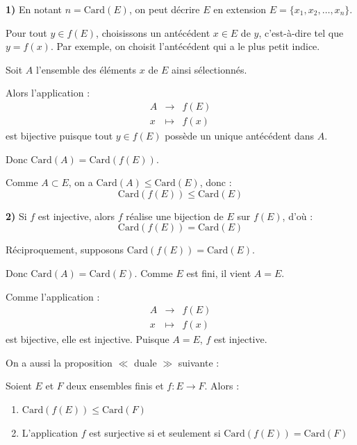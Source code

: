 \documentclass[a4paper,11pt]{article}
\begin{document}
\begin{demonstration}
    \textbf{1)} En notant $n = \text{Card}(E)$, on peut décrire $E$ en extension $E = \{x_1, x_2, \dots, x_n\}$.
    
    Pour tout $y \in f(E)$, choisissons un antécédent $x \in E$ de $y$, c'est-à-dire tel que $y = f(x)$. Par exemple, on choisit l'antécédent qui a le plus petit indice.
    
    Soit $A$ l'ensemble des éléments $x$ de $E$ ainsi sélectionnés.
    
    Alors l'application :
    \[
    \begin{array}{ccc}
        A & \longrightarrow & f(E) \\
        x & \longmapsto & f(x)
    \end{array}
    \]
    est bijective puisque tout $y \in f(E)$ possède un unique antécédent dans $A$.
    
    Donc $\text{Card}(A) = \text{Card}(f(E))$.
    
    Comme $A \subset E$, on a $\text{Card}(A) \le \text{Card}(E)$, donc :
    \[
    \text{Card}(f(E)) \le \text{Card}(E)
    \]
    
    \vspace{10pt}
    \textbf{2)} Si $f$ est injective, alors $f$ réalise une bijection de $E$ sur $f(E)$, d'où :
    \[
    \text{Card}(f(E)) = \text{Card}(E)
    \]
    
    Réciproquement, supposons $\text{Card}(f(E)) = \text{Card}(E)$.
    
    Donc $\text{Card}(A) = \text{Card}(E)$. Comme $E$ est fini, il vient $A = E$.
    
    Comme l'application :
    \[
    \begin{array}{ccc}
        A & \longrightarrow & f(E) \\
        x & \longmapsto & f(x)
    \end{array}
    \]
    est bijective, elle est injective. Puisque $A = E$, $f$ est injective.
\end{demonstration}

On a aussi la proposition $\ll$ duale $\gg$ suivante :

\begin{proposition}
    Soient $E$ et $F$ deux ensembles finis et $f : E \to F$. Alors :
    \begin{enumerate}
        \item $\text{Card}(f(E)) \le \text{Card}(F)$
        \item L'application $f$ est surjective si et seulement si $\text{Card}(f(E)) = \text{Card}(F)$
    \end{enumerate}
\end{proposition}
\end{document}
